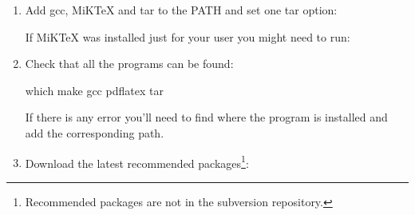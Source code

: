 \documentclass[
  letterpaper,
  DIV=11,
  numbers=noendperiod]{scrreprt}
\newenvironment{Shaded}{\begin{snugshade}}{\end{snugshade}}
\newcommand{\AttributeTok}[1]{\textcolor[rgb]{0.40,0.45,0.13}{#1}}
\newcommand{\BuiltInTok}[1]{\textcolor[rgb]{0.00,0.23,0.31}{#1}}
\newcommand{\FunctionTok}[1]{\textcolor[rgb]{0.28,0.35,0.67}{#1}}
\newcommand{\NormalTok}[1]{\textcolor[rgb]{0.00,0.23,0.31}{#1}}
\newcommand{\OperatorTok}[1]{\textcolor[rgb]{0.37,0.37,0.37}{#1}}
\newcommand{\StringTok}[1]{\textcolor[rgb]{0.13,0.47,0.30}{#1}}
\newcommand{\VariableTok}[1]{\textcolor[rgb]{0.07,0.07,0.07}{#1}}
\begin{document}
\begin{enumerate}
\begin{Shaded}
\end{Shaded}
\item
  Add gcc, MiKTeX and tar to the PATH and set one tar option:

\begin{Shaded}
\end{Shaded}

  If MiKTeX was installed just for your user you might need to run:

\begin{Shaded}
\end{Shaded}
\item
  Check that all the programs can be found:

\begin{Shaded}
\begin{Highlighting}[]
\FunctionTok{which}\NormalTok{ make gcc pdflatex tar}
\end{Highlighting}
\end{Shaded}

  If there is any error you'll need to find where the program is
  installed and add the corresponding path.
\item
  Download the latest recommended packages\footnote{Recommended packages
    are not in the subversion repository.}:


\end{enumerate}
\end{document}
